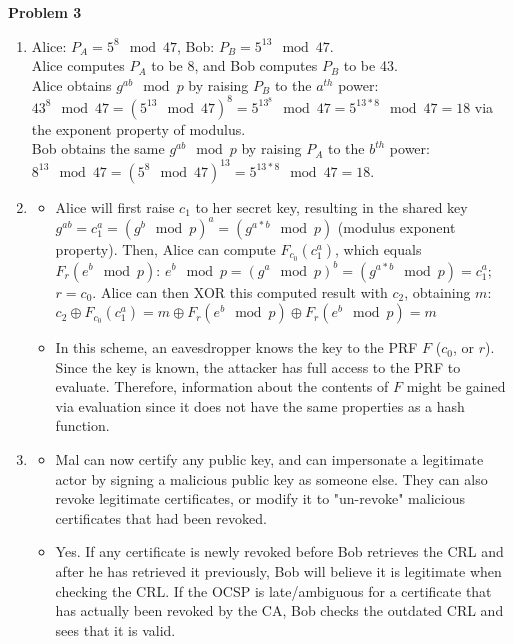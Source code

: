\documentclass{article}
\begin{document}
\textbf{Problem 3}
\begin{enumerate}
	\item Alice: $P_A=5^8\mod 47$, Bob: $P_B=5^{13}\mod 47$.\\
		Alice computes $P_A$ to be 8, and Bob computes $P_B$ to be 43.\\
		Alice obtains $g^{ab}\mod p$ by raising $P_B$ to the $a^{th}$ power: $43^8\mod 47=(5^{13}\mod 47)^8=5^{13^8}\mod 47=5^{13*8}\mod 47=18$ via the exponent property of modulus.\\
		Bob obtains the same $g^{ab}\mod p$ by raising $P_A$ to the $b^{th}$ power: $8^{13}\mod 47=(5^8\mod 47)^{13}=5^{13*8}\mod 47=18$.
	\item \begin{itemize}
			\item[(a)] Alice will first raise $c_1$ to her secret key, resulting in the shared key $g^{ab}=c_1^a=(g^b\mod p)^a=(g^{a*b}\mod p)$ (modulus exponent property). Then, Alice can compute $F_{c_0}(c_1^a)$, which equals $F_r(e^b\mod p)$: $e^b\mod p = (g^a\mod p)^b = (g^{a*b}\mod p)=c_1^a$; $r=c_0$. Alice can then XOR this computed result with $c_2$, obtaining $m$: $c_2\oplus F_{c_0}(c_1^a)=m\oplus F_r(e^b\mod p)\oplus F_r(e^b\mod p)=m$
			\item[(b)] In this scheme, an eavesdropper knows the key to the PRF $F$ ($c_0$, or $r$). Since the key is known, the attacker has full access to the PRF to evaluate. Therefore, information about the contents of $F$ might be gained via evaluation since it does not have the same properties as a hash function.
		\end{itemize}
	\item \begin{itemize}
			\item[(a)] Mal can now certify any public key, and can impersonate a legitimate actor by signing a malicious public key as someone else. They can also revoke legitimate certificates, or modify it to "un-revoke" malicious certificates that had been revoked.
			\item[(b)] Yes. If any certificate is newly revoked before Bob retrieves the CRL and after he has retrieved it previously, Bob will believe it is legitimate when checking the CRL. If the OCSP is late/ambiguous for a certificate that has actually been revoked by the CA, Bob checks the outdated CRL and sees that it is valid.
	\end{itemize}
\end{enumerate}
\end{document}
